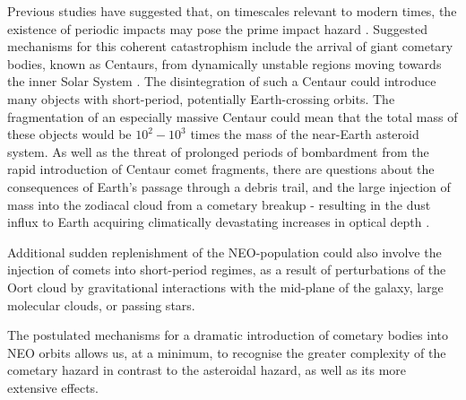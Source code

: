 Previous studies have suggested that, on timescales relevant to modern times, the existence of periodic impacts may pose the prime impact hazard \citep{ASHER19941}. Suggested mechanisms for this coherent catastrophism include the arrival of giant cometary bodies, known as Centaurs, from dynamically unstable regions moving towards the inner Solar System \citep{2015A&G....56f6.24N}. The disintegration of such a Centaur could introduce many objects with short-period, potentially Earth-crossing orbits. The fragmentation of an especially massive Centaur could mean that the total mass of these objects would be $10^{2}-10^{3}$ times the mass of the near-Earth asteroid system. As well as the threat of prolonged periods of bombardment from the rapid introduction of Centaur comet fragments, there are questions about the consequences of Earth's passage through a debris trail, and the large injection of mass into the zodiacal cloud from a cometary breakup - resulting in the dust influx to Earth acquiring climatically devastating increases in optical depth \citep{2001MNRAS.321..463N, 2015MNRAS.448...27N}.

Additional sudden replenishment of the NEO-population could also involve the injection of comets into short-period regimes, as a result of perturbations of the Oort cloud by gravitational interactions with the mid-plane of the galaxy, large molecular clouds, or passing stars.

The postulated mechanisms for a dramatic introduction of cometary bodies into NEO orbits allows us, at a minimum, to recognise the greater complexity of the cometary hazard in contrast to the asteroidal hazard, as well as its more extensive effects.






